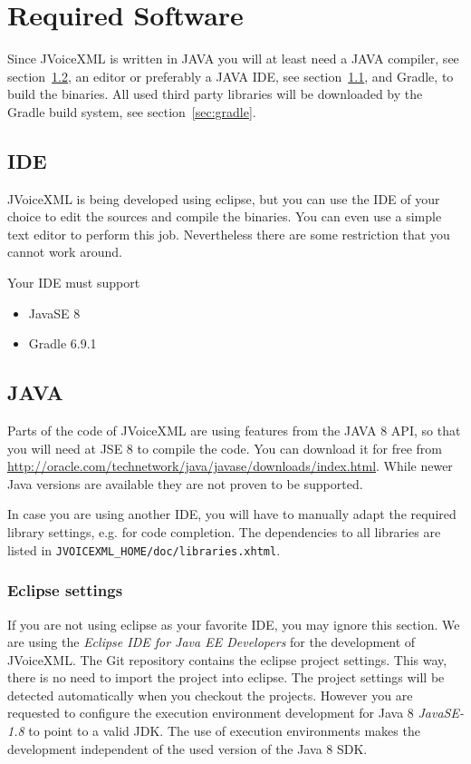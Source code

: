 \documentclass[11pt,a4paper]{article}
\begin{document}
\section{Required Software}
\label{sec:required-software}

Since JVoiceXML is written in JAVA you will at least need a
JAVA compiler, see section~\ref{sec:java}, an editor or preferably a JAVA
IDE, see section~\ref{sec:ide}, and Gradle, to build the
binaries. All used third party libraries will be downloaded by the
Gradle build system, see section~\ref{sec:gradle}.

\subsection{IDE}
\label{sec:ide}

JVoiceXML is being developed using eclipse, but you can use the IDE of your
choice to edit the sources and compile the binaries. You can even use a simple
text editor to perform this job. Nevertheless there are some restriction that
you cannot work around.

Your IDE must support

\begin{itemize}
\item JavaSE 8
\item Gradle 6.9.1
\end{itemize}

\subsection{JAVA}
\label{sec:java}

Parts of the code of JVoiceXML are using features from the JAVA 8 API, so that
you will need at JSE 8 to compile the code. You can download it
for free from \url{http://oracle.com/technetwork/java/javase/downloads/index.html}.
While newer Java versions are available they are not proven to be supported.

In case you are using another IDE, you will have to manually adapt
the required library settings, e.g. for code completion. The dependencies to all
libraries are listed in \lstinline{JVOICEXML_HOME/doc/libraries.xhtml}.

\subsubsection{Eclipse settings}
\label{sec:eclipse}

If you are not using eclipse as your favorite IDE, you may ignore this section.
We are using the \emph{Eclipse IDE for Java EE Developers}
for the development of JVoiceXML. The Git repository contains the eclipse
project settings. This way, there is no need to import the
project into eclipse. The project settings will be detected 
automatically when you checkout the projects. However you are requested to configure the execution
environment development for Java 8 \emph{JavaSE-1.8} to point to a valid JDK.
The use of execution environments makes the development independent of the
used version of the Java 8 SDK.
\end{document}

